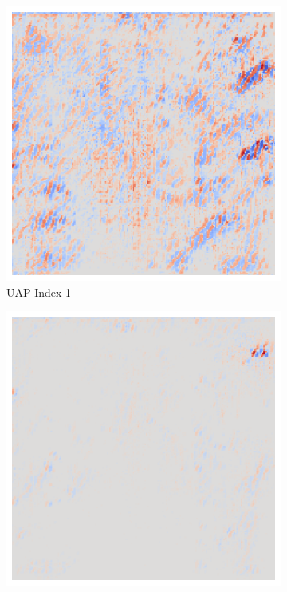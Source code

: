 \begin{figure}[ht!]
\begin{subfigure}{0.19\linewidth}
        \includegraphics[height=1\linewidth]{01-images/05-resultate/uap_resnet/uap1-resnet18-covid-n200-robustificationslevel0.png}
        \caption{UAP Index 1}
    \end{subfigure}\hfill%
    \begin{subfigure}{0.19\linewidth}
        \centering
        \includegraphics[height=1\linewidth]{01-images/05-resultate/uap_resnet/uap2-resnet18-covid-n200-robustificationslevel0.png}

\end{subfigure}
\end{figure}
